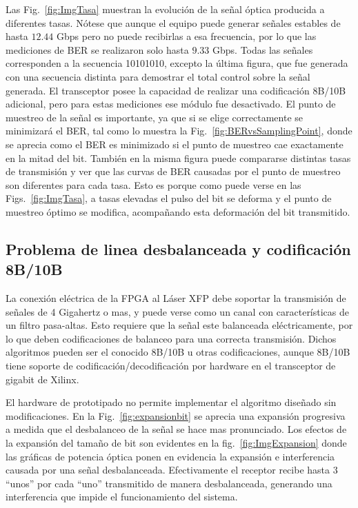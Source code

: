 Las Fig.~\ref{fig:ImgTasa} muestran la evolución de la señal óptica producida a diferentes
tasas. Nótese que aunque el equipo puede generar señales estables de
hasta $12.44$ Gbps pero no puede recibirlas a esa frecuencia, por lo que las
mediciones de BER se realizaron solo hasta $9.33$ Gbps. Todas las señales
corresponden a la secuencia 10101010, excepto la última figura,
que fue generada con una secuencia distinta para demostrar el total
control sobre la señal generada. El transceptor posee la capacidad de
realizar una codificación 8B/10B adicional, pero para estas mediciones
ese módulo fue desactivado.
El punto de muestreo de la señal es importante, ya que si se elige correctamente se minimizará el BER, tal como lo muestra la Fig.~\ref{fig:BERvsSamplingPoint}, donde se aprecia como el BER es minimizado si el punto de muestreo cae exactamente en la mitad del bit. También en la misma figura puede compararse distintas tasas de transmisión y ver que las curvas de BER causadas por el punto de muestreo son diferentes para cada tasa. Esto es porque como puede verse en las Figs.~\ref{fig:ImgTasa}, a tasas elevadas el pulso del bit se deforma y el punto de muestreo óptimo se modifica, acompañando esta deformación del bit transmitido.


\subsection{Problema de linea desbalanceada y codificación 8B/10B}
La conexión eléctrica de la FPGA al Láser XFP debe soportar la transmisión de señales de 4 Gigahertz o mas, y puede verse como un canal con características de un filtro pasa-altas. Esto requiere que la señal este balanceada eléctricamente, por lo que deben codificaciones de balanceo para una correcta transmisión. Dichos algoritmos pueden ser el conocido 8B/10B u otras codificaciones, aunque 8B/10B tiene soporte de codificación/decodificación por hardware en el transceptor de gigabit de Xilinx.

El hardware de prototipado no permite implementar el algoritmo diseñado sin modificaciones. En la Fig.~\ref{fig:expansionbit} se aprecia una expansión progresiva a medida que el desbalanceo de la señal se hace mas pronunciado. Los efectos de la expansión del tamaño de bit son evidentes en la fig.~\ref{fig:ImgExpansion} donde las gráficas de potencia óptica ponen en evidencia la expansión e interferencia causada por una señal desbalanceada.
Efectivamente el receptor recibe hasta 3 ``unos'' por cada ``uno'' transmitido de manera desbalanceada, generando una interferencia que impide el funcionamiento del sistema.

